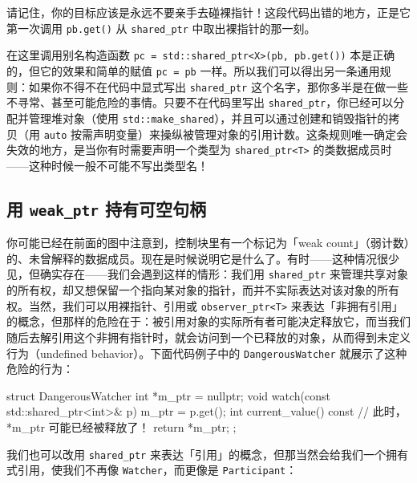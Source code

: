 请记住，你的目标应该是永远不要亲手去碰裸指针！这段代码出错的地方，正是它第一次调用 \texttt{pb.\allowbreak{}get(\allowbreak{})\allowbreak{}} 从 \texttt{shared\_\allowbreak{}ptr} 中取出裸指针的那一刻。

在这里调用别名构造函数 \texttt{pc = std::\allowbreak{}shared\_\allowbreak{}ptr<\allowbreak{}X>\allowbreak{}(\allowbreak{}pb,\allowbreak{} pb.\allowbreak{}get(\allowbreak{})\allowbreak{})\allowbreak{}} 本是正确的，但它的效果和简单的赋值 \texttt{pc = pb} 一样。所以我们可以得出另一条通用规则：如果你不得不在代码中显式写出 \texttt{shared\_\allowbreak{}ptr} 这个名字，那你多半是在做一些不寻常、甚至可能危险的事情。只要不在代码里写出 \texttt{shared\_\allowbreak{}ptr}，你已经可以分配并管理堆对象（使用 \texttt{std::\allowbreak{}make\_\allowbreak{}shared}），并且可以通过创建和销毁指针的拷贝（用 \texttt{auto} 按需声明变量）来操纵被管理对象的引用计数。这条规则唯一确定会失效的地方，是当你有时需要声明一个类型为 \texttt{shared\_\allowbreak{}ptr<\allowbreak{}T>\allowbreak{}} 的类数据成员时——这种时候一般不可能不写出类型名！

\subsection{用 \texttt{weak\_\allowbreak{}ptr} 持有可空句柄}

你可能已经在前面的图中注意到，控制块里有一个标记为「weak count」（弱计数）的、未曾解释的数据成员。现在是时候说明它是什么了。有时——这种情况很少见，但确实存在——我们会遇到这样的情形：我们用 \texttt{shared\_\allowbreak{}ptr} 来管理共享对象的所有权，却又想保留一个指向某对象的指针，而并不实际表达对该对象的所有权。当然，我们可以用裸指针、引用或 \texttt{observer\_\allowbreak{}ptr<\allowbreak{}T>\allowbreak{}} 来表达「非拥有引用」的概念，但那样的危险在于：被引用对象的实际所有者可能决定释放它，而当我们随后去解引用这个非拥有指针时，就会访问到一个已释放的对象，从而得到未定义行为（undefined behavior）。下面代码例子中的 \texttt{Dangerous\allowbreak{}Watcher} 就展示了这种危险的行为：

\begin{codebox}[cpp]
    struct DangerousWatcher {
      int *m_ptr = nullptr;
      void watch(const std::shared_ptr<int>& p) {
        m_ptr = p.get();
      }
      int current_value() const {
        // 此时，*m_ptr 可能已经被释放了！
        return *m_ptr;
      }
    };
\end{codebox}

我们也可以改用 \texttt{shared\_\allowbreak{}ptr} 来表达「引用」的概念，但那当然会给我们一个拥有式引用，使我们不再像 \texttt{Watcher}，而更像是 \texttt{Participant}：

